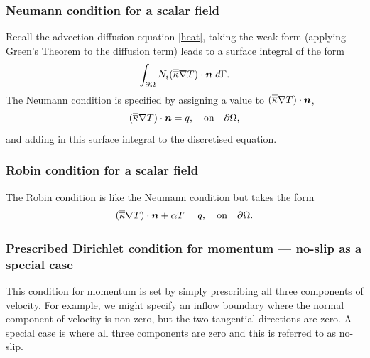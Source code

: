 \subsubsection{Neumann condition for a scalar field}\label{sect:bc_scalar_neumann}
Recall the advection-diffusion equation \eqref{heat}, taking the weak form (applying Green's
Theorem to the diffusion term) leads to a surface integral of the form
\begin{equation*}
\int_{\partial\Omega} N_i (\overline{\overline{\kappa}}\nabla T)\cdot{\mbox{\boldmath$n$}} \;d\Gamma.
\end{equation*}
The Neumann condition is specified by assigning a value to $(\overline{\overline{\kappa}}\nabla T)\cdot{\mbox{\boldmath$n$}}$, \eg
\begin{equation*}
(\overline{\overline{\kappa}}\nabla T)\cdot{\mbox{\boldmath$n$}} = q,\quad \textrm{on}\quad \partial\Omega,
\end{equation*}
and adding in this surface integral to the discretised equation.


\subsubsection{Robin condition for a scalar field}\label{sect:bc_scalar_robin}
The Robin condition is like the Neumann condition but takes the form
\begin{equation*}
(\overline{\overline{\kappa}}\nabla T)\cdot{\mbox{\boldmath$n$}} + \alpha T = q,\quad \textrm{on}\quad \partial\Omega.
\end{equation*}


\subsubsection{Prescribed Dirichlet condition for momentum --- no-slip as a special case}\label{sect:bc_vector_dirichlet}
This condition for momentum is set by simply prescribing all three components of
velocity. For example, we might specify an inflow boundary where the normal component
of velocity is non-zero, but the two tangential directions are zero. A special case is
where all three components are zero and this is referred to as no-slip.


